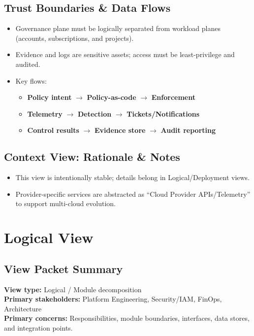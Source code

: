 \documentclass[11pt]{report}
\begin{document}
\section{Trust Boundaries \& Data Flows}
\begin{itemize}
  \item Governance plane must be logically separated from workload planes (accounts, subscriptions, and projects).
  \item Evidence and logs are sensitive assets; access must be least-privilege and audited.
  \item Key flows:
    \begin{itemize}
      \item \textbf{Policy intent} $\rightarrow$ \textbf{Policy-as-code} $\rightarrow$ \textbf{Enforcement}
      \item \textbf{Telemetry} $\rightarrow$ \textbf{Detection} $\rightarrow$ \textbf{Tickets/Notifications}
      \item \textbf{Control results} $\rightarrow$ \textbf{Evidence store} $\rightarrow$ \textbf{Audit reporting}
    \end{itemize}
\end{itemize}

\section{Context View: Rationale \& Notes}
\begin{itemize}
  \item This view is intentionally stable; details belong in Logical/Deployment views.
  \item Provider-specific services are abstracted as “Cloud Provider APIs/Telemetry” to support multi-cloud evolution.
\end{itemize}

\clearpage

\chapter{Logical View}
\section{View Packet Summary}
\begin{viewbox}
\textbf{View type:} Logical / Module decomposition\\
\textbf{Primary stakeholders:} Platform Engineering, Security/IAM, FinOps, Architecture\\
\textbf{Primary concerns:} Responsibilities, module boundaries, interfaces, data stores, and integration points.
\end{viewbox}
\end{document}
